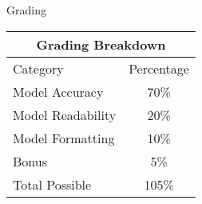 \documentclass[]{article}
\begin{document}
\begin{section}{Grading}
\begin{center}
\begin{tabular}{lc}
\multicolumn{2}{c}{Grading Breakdown}\\

\toprule
Category & Percentage\\

\cmidrule(lr){1-2}
Model Accuracy & 70\%\\
Model Readability & 20\%\\
Model Formatting & 10\%\\
Bonus & 5\%\\

\midrule
Total Possible & 105\%\\

\bottomrule
\end{tabular}
\end{center}
\end{section}
\end{document}
